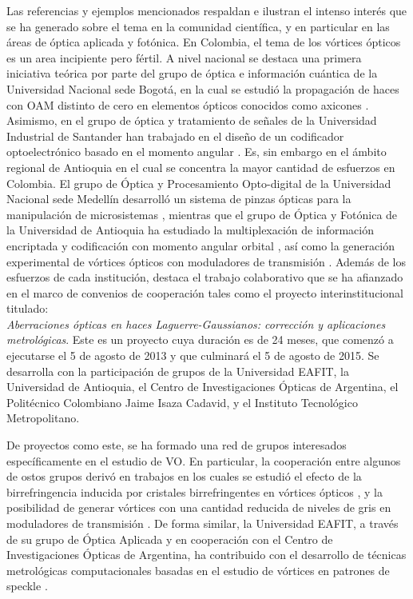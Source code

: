 Las referencias y ejemplos mencionados respaldan e ilustran el
intenso interés que se ha generado sobre el tema en la 
comunidad científica, y en particular en las áreas de óptica
aplicada y fotónica.  En Colombia, el tema de los vórtices ópticos es
un area  incipiente pero fértil. A nivel nacional se destaca una primera
iniciativa teórica por parte del grupo de óptica e información
cuántica de la  Universidad Nacional sede
Bogotá, en la cual se estudió la propagación de haces con OAM distinto de
cero en elementos ópticos conocidos como axicones
. Asimismo, en el grupo de óptica y tratamiento de
señales de la Universidad Industrial de Santander han trabajado en el diseño de un codificador optoelectrónico
basado en el momento angular . Es,
sin embargo en el ámbito regional de Antioquia en el cual se
concentra la mayor cantidad de esfuerzos en Colombia.  El grupo de
Óptica y Procesamiento Opto-digital de la Universidad 
Nacional sede Medellín desarrolló un sistema de pinzas ópticas para la
manipulación de microsistemas , mientras que el grupo de Óptica y Fotónica
de la Universidad de Antioquia ha estudiado la multiplexación de
información encriptada y codificación con momento angular
orbital , así como la generación experimental de
vórtices ópticos con moduladores de transmisión
. Además de los esfuerzos
de cada institución, destaca el trabajo colaborativo que se ha afianzado en el marco de convenios de
cooperación tales como el proyecto interinstitucional titulado:\\
\textit{Aberraciones ópticas en haces Laguerre-Gaussianos: corrección
  y aplicaciones metrológicas}. Este es un proyecto cuya duración es de 24 meses, que
comenzó a ejecutarse el 5 de agosto de 2013 y que culminará el 5 de
agosto de 2015. Se desarrolla con la participación de grupos de la
Universidad EAFIT, la Universidad de Antioquia, el Centro de
Investigaciones Ópticas de Argentina, el Politécnico Colombiano Jaime
Isaza Cadavid, y el Instituto Tecnológico Metropolitano. 

De proyectos como este, se ha formado una red de grupos interesados
específicamente en el estudio de VO. En particular,
la cooperación entre algunos de ostos grupos derivó en trabajos en los
cuales se estudió el efecto de la birrefringencia inducida por
cristales birrefringentes en vórtices ópticos , y la
posibilidad de generar vórtices con una cantidad reducida de niveles
de gris en moduladores de transmisión . De forma
similar, la Universidad EAFIT, a través de su grupo de Óptica Aplicada
y en cooperación con el Centro de Investigaciones Ópticas de
Argentina,  ha contribuido con el desarrollo de técnicas metrológicas
computacionales basadas en el estudio de  vórtices en patrones de
speckle
. 



